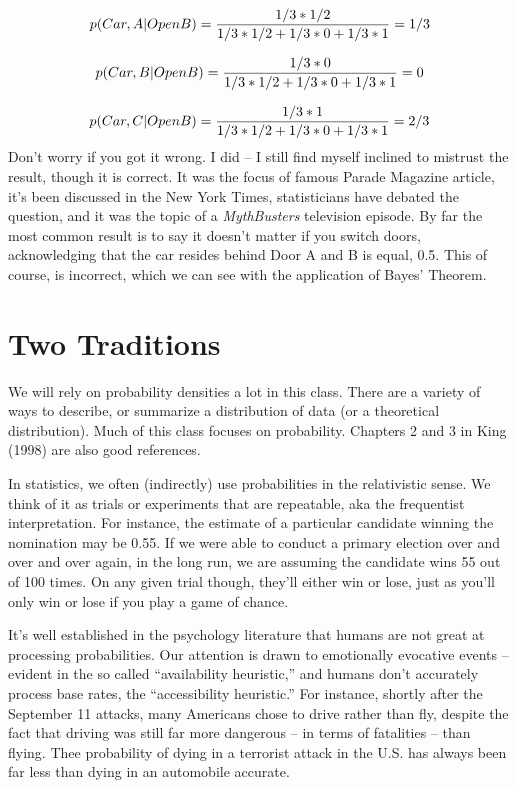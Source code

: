 \documentclass[
]{book}
\begin{document}
\[p(Car,A|OpenB) = {{1/3 * 1/2}\over{1/3*1/2+ 1/3*0 + 1/3*1}} = 1/3\]

\[p(Car,B|OpenB) = {{1/3 * 0}\over{1/3*1/2+ 1/3*0 + 1/3*1}} = 0\]

\[p(Car,C|OpenB) = {{1/3 * 1}\over{1/3*1/2+ 1/3*0 + 1/3*1}} = 2/3\] Don't worry if you got it wrong. I did -- I still find myself inclined to mistrust the result, though it is correct. It was the focus of famous Parade Magazine article, it's been discussed in the New York Times, statisticians have debated the question, and it was the topic of a \emph{MythBusters} television episode. By far the most common result is to say it doesn't matter if you switch doors, acknowledging that the car resides behind Door A and B is equal, 0.5. This of course, is incorrect, which we can see with the application of Bayes' Theorem.

\section{Two Traditions}\label{two-traditions}

We will rely on probability densities a lot in this class. There are a variety of ways to describe, or summarize a distribution of data (or a theoretical distribution). Much of this class focuses on probability. Chapters 2 and 3 in King (1998) are also good references.

In statistics, we often (indirectly) use probabilities in the relativistic sense. We think of it as trials or experiments that are repeatable, aka the frequentist interpretation. For instance, the estimate of a particular candidate winning the nomination may be 0.55. If we were able to conduct a primary election over and over and over again, in the long run, we are assuming the candidate wins 55 out of 100 times. On any given trial though, they'll either win or lose, just as you'll only win or lose if you play a game of chance.

It's well established in the psychology literature that humans are not great at processing probabilities. Our attention is drawn to emotionally evocative events -- evident in the so called ``availability heuristic,'' and humans don't accurately process base rates, the ``accessibility heuristic.'' For instance, shortly after the September 11 attacks, many Americans chose to drive rather than fly, despite the fact that driving was still far more dangerous -- in terms of fatalities -- than flying. Thee probability of dying in a terrorist attack in the U.S. has always been far less than dying in an automobile accurate.
\end{document}
